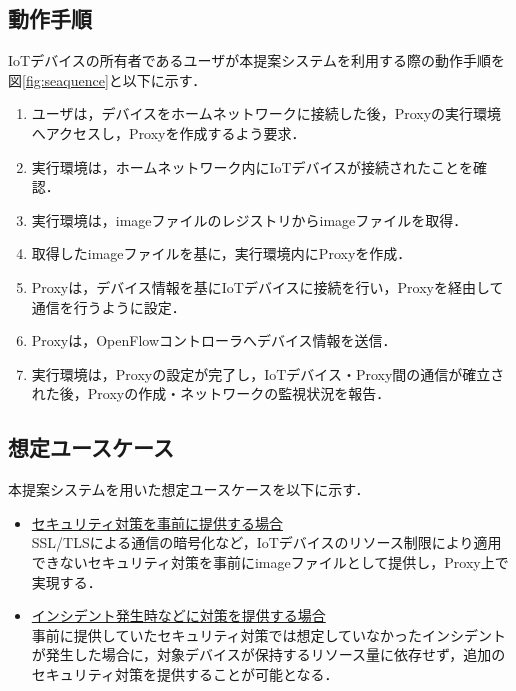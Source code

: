 \documentclass[Japanese]{dicomopapers}
\begin{document}
\subsection{動作手順}
IoTデバイスの所有者であるユーザが本提案システムを利用する際の動作手順を図\ref{fig:seaquence}と以下に示す．
\begin{enumerate}
	\item ユーザは，デバイスをホームネットワークに接続した後，Proxyの実行環境へアクセスし，Proxyを作成するよう要求．
	\item 実行環境は，ホームネットワーク内にIoTデバイスが接続されたことを確認．
	\item 実行環境は，imageファイルのレジストリからimageファイルを取得．
	\item 取得したimageファイルを基に，実行環境内にProxyを作成．
	\item Proxyは，デバイス情報を基にIoTデバイスに接続を行い，Proxyを経由して通信を行うように設定．
	\item Proxyは，OpenFlowコントローラへデバイス情報を送信．
	\item 実行環境は，Proxyの設定が完了し，IoTデバイス・Proxy間の通信が確立された後，Proxyの作成・ネットワークの監視状況を報告．
\end{enumerate}


\subsection{想定ユースケース}
本提案システムを用いた想定ユースケースを以下に示す．

\begin{itemize}
	\item \underline{セキュリティ対策を事前に提供する場合}\mbox{}\\
	      SSL/TLSによる通信の暗号化など，IoTデバイスのリソース制限により適用できないセキュリティ対策を事前にimageファイルとして提供し，Proxy上で実現する．
	\item \underline{インシデント発生時などに対策を提供する場合}\mbox{}\\
	      事前に提供していたセキュリティ対策では想定していなかったインシデントが発生した場合に，対象デバイスが保持するリソース量に依存せず，追加のセキュリティ対策を提供することが可能となる．
\end{itemize}
\end{document}
